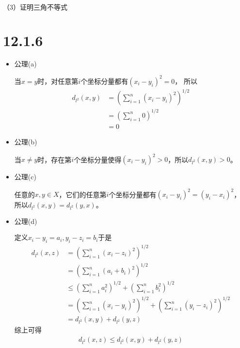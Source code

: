 \documentclass{article}
\begin{document}
（3）证明三角不等式



\section*{12.1.6}

\begin{itemize}
      \item 公理(a)

            当$x = y$时，对任意第$i$个坐标分量都有$(x_i - y_i)^2 = 0$， 所以
            \begin{align*}
                  d_{l^2}(x, y) & = \left(\sum\limits_{i=1}^n (x_i - y_i)^2\right)^{1/2} \\
                                & = \left(\sum\limits_{i=1}^n 0 \right)^{1/2}            \\
                                & = 0
            \end{align*}
      \item 公理(b)

            当$x \neq y$时，存在第$i$个坐标分量使得$(x_i - y_i)^2 > 0$，所以$d_{l^2}(x, y) > 0$。

      \item 公理(c)

            任意的$x, y \in X$，它们的任意第$i$个坐标分量都有$(x_i - y_i)^2 = (y_i - x_i)^2$，所以$d_{l^2}(x, y) = d_{l^2}(y, x)$。

      \item 公理(d)

            定义$x_i - y_i = a_i, y_i - z_i = b_i$于是
            \begin{align*}
                  d_{l^2}(x, z) & = \left(\sum\limits_{i=1}^n (x_i - z_i)^2\right)^{1/2}                                                        \\
                                & = \left(\sum\limits_{i=1}^n (a_i + b_i)^2\right)^{1/2}                                                        \\
                                & \leq \left(\sum\limits_{i=1}^n a_i^2\right)^{1/2} + \left(\sum\limits_{i=1}^n b_i^2\right)^{1/2}              \\
                                & = \left(\sum\limits_{i=1}^n (x_i - y_i)^2\right)^{1/2} + \left(\sum\limits_{i=1}^n (y_i - z_i)^2\right)^{1/2} \\
                                & = d_{l^2}(x, y) + d_{l^2}(y, z)
            \end{align*}
            综上可得
            \begin{align*}
                  d_{l^2}(x, z) \leq d_{l^2}(x, y) + d_{l^2}(y, z)
            \end{align*}

\end{itemize}
\end{document}
